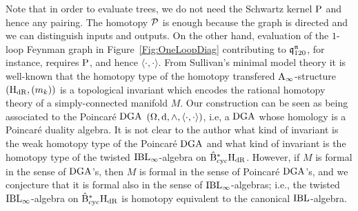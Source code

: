 \documentclass[\MainFolder/Text.tex]{subfiles}
\begin{document}
Note that in order to evaluate trees, we do not need the Schwartz kernel $\mathrm{P}$ and hence any pairing. The homotopy $\mathcal{P}$ is enough because the graph is directed and we can distinguish inputs and outputs. On the other hand, evaluation of the $1$-loop Feynman graph in Figure~\ref{Fig:OneLoopDiag} contributing to $\mathfrak{q}_{120}^{\mathfrak{n}}$, for instance, requires $\mathrm{P}$, and hence $\langle\cdot,\cdot\rangle$. From Sullivan's minimal model theory it is well-known that the homotopy type of the homotopy transfered $\mathrm{A}_\infty$-structure $(\mathrm{H}_{\mathrm{dR}},(m_k))$ is a topological invariant which encodes the rational homotopy theory of a simply-connected manifold $M$. Our construction can be seen as being associated to the Poincar\'e $\mathrm{DGA}$ $(\Omega,\mathrm{d},\wedge, \langle\cdot,\cdot\rangle)$, i.e, a $\mathrm{DGA}$ whose homology is a Poincar\'e duality algebra. It is not clear to the author what kind of invariant is the weak homotopy type of the Poincar\'e $\mathrm{DGA}$ and what kind of invariant is the homotopy type of the twisted $\mathrm{IBL}_\infty$-algebra on $\hat{\mathrm{B}}_{\mathrm{cyc}}^* \mathrm{H}_{\mathrm{dR}}$. However, if $M$ is formal in the sense of $\mathrm{DGA}$'s, then $M$ is formal in the sense of Poincar\'e $\mathrm{DGA}$'s, and we conjecture that it is formal also in the sense of $\mathrm{IBL}_\infty$-algebras; i.e., the twisted $\mathrm{IBL}_\infty$-algebra on $\hat{\mathrm{B}}_{\mathrm{cyc}}^* \mathrm{H}_{\mathrm{dR}}$ is homotopy equivalent to the canonical $\mathrm{IBL}$-algebra.
\end{document}
